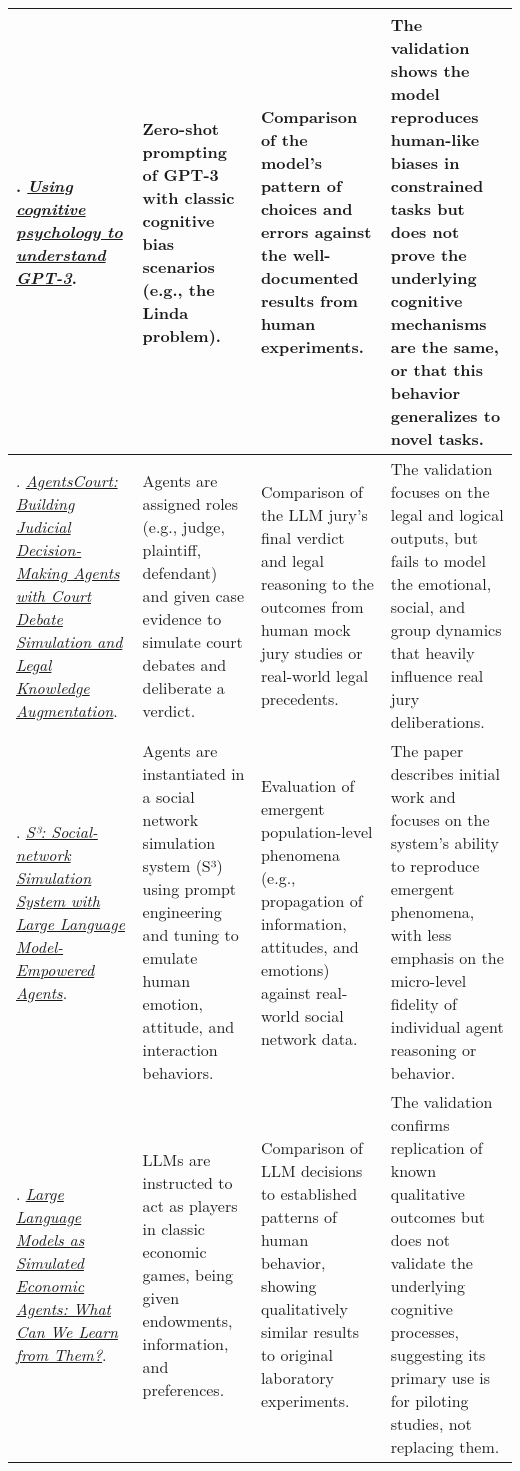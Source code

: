 {\begin{longtable}{| L{4.5cm} | L{3.5cm} | L{3.5cm} | L{3.5cm} |}
\\\hline
\citet{binz2023using}. \href{https://doi.org/10.1073/pnas.2218523120}{\textit{Using cognitive psychology to understand GPT-3}}. & Zero-shot prompting of GPT-3 with classic cognitive bias scenarios (e.g., the Linda problem). & Comparison of the model's pattern of choices and errors against the well-documented results from human experiments. & The validation shows the model reproduces human-like biases in constrained tasks but does not prove the underlying cognitive mechanisms are the same, or that this behavior generalizes to novel tasks.
\\\hline
\citet{he2024agentscourt}. \href{https://arxiv.org/abs/2403.02959}{\textit{AgentsCourt: Building Judicial Decision-Making Agents with Court Debate Simulation and Legal Knowledge Augmentation}}. & Agents are assigned roles (e.g., judge, plaintiff, defendant) and given case evidence to simulate court debates and deliberate a verdict. & Comparison of the LLM jury's final verdict and legal reasoning to the outcomes from human mock jury studies or real-world legal precedents. & The validation focuses on the legal and logical outputs, but fails to model the emotional, social, and group dynamics that heavily influence real jury deliberations.
\\\hline
\citet{gao2023s3}. \href{https://arxiv.org/abs/2307.14984}{\textit{S³: Social-network Simulation System with Large Language Model-Empowered Agents}}. & Agents are instantiated in a social network simulation system (S³) using prompt engineering and tuning to emulate human emotion, attitude, and interaction behaviors. & Evaluation of emergent population-level phenomena (e.g., propagation of information, attitudes, and emotions) against real-world social network data. & The paper describes initial work and focuses on the system's ability to reproduce emergent phenomena, with less emphasis on the micro-level fidelity of individual agent reasoning or behavior.
\\\hline
\citet{horton2023large}. \href{https://www.nber.org/papers/w31122}{\textit{Large Language Models as Simulated Economic Agents: What Can We Learn from Them?}}. & LLMs are instructed to act as players in classic economic games, being given endowments, information, and preferences. & Comparison of LLM decisions to established patterns of human behavior, showing qualitatively similar results to original laboratory experiments. & The validation confirms replication of known qualitative outcomes but does not validate the underlying cognitive processes, suggesting its primary use is for piloting studies, not replacing them.

\end{longtable}}
